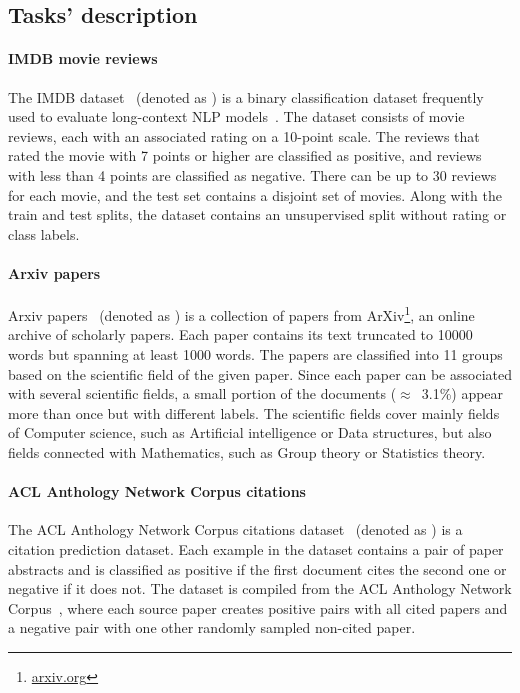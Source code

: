 \subsection{Tasks' description}

\paragraph{IMDB movie reviews} The IMDB dataset~\citep{maas2011learning}
(denoted as ) is a binary classification dataset frequently used to
evaluate long-context NLP models~\citep{zaheer2020big, beltagy2020longformer,
le2014distributed}. The dataset consists of movie reviews, each with an
associated rating on a 10-point scale. The reviews that rated the movie with 7
points or higher are classified as positive, and reviews with less than 4
points are classified as negative. There can be up to 30 reviews for each
movie, and the test set contains a disjoint set of movies. Along with the train
and test splits, the dataset contains an unsupervised split without rating or
class labels.

\paragraph{Arxiv papers} Arxiv papers~\citep{arxiv_papers} (denoted as
) is a collection of papers from ArXiv\footnote{\url{arxiv.org}},
an online archive of scholarly papers. Each paper contains its text truncated
to 10000 words but spanning at least 1000 words. The papers are classified into
11 groups based on the scientific field of the given paper. Since each paper
can be associated with several scientific fields, a small portion of the
documents ($\approx$~3.1\%) appear more than once but with different labels.
The scientific fields cover mainly fields of Computer science, such as
Artificial intelligence or Data structures, but also fields connected with
Mathematics, such as Group theory or Statistics theory.

\paragraph{ACL Anthology Network Corpus citations} The ACL Anthology Network
Corpus citations dataset~\citep{zhou2020multilevel} (denoted as ) is
a citation prediction dataset. Each example in the dataset contains a pair of
paper abstracts and is classified as positive if the first document cites the
second one or negative if it does not. The dataset is compiled from the ACL
Anthology Network Corpus~\citep{radev2013acl}, where each source paper creates
positive pairs with all cited papers and a negative pair with one other randomly
sampled non-cited paper.

